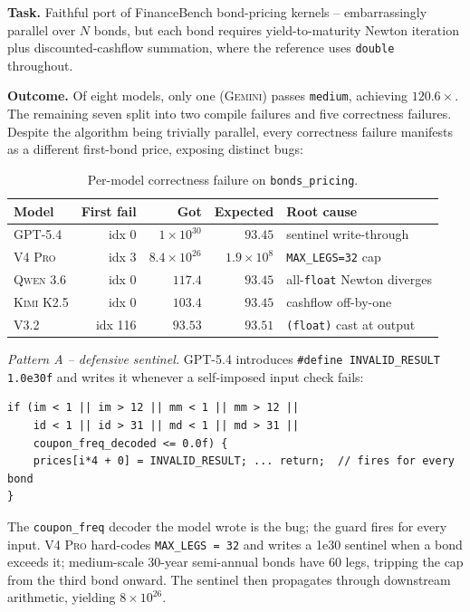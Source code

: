 \documentclass{article}
\begin{document}
\textbf{Task.} Faithful port of FinanceBench bond-pricing kernels --
embarrassingly parallel over $N$ bonds, but each bond requires
yield-to-maturity Newton iteration plus discounted-cashflow
summation, where the reference uses \texttt{double} throughout.

\textbf{Outcome.} Of eight models, only one (\textsc{Gemini}) passes
\texttt{medium}, achieving $120.6\times$. The remaining seven split
into two compile failures and five correctness failures. Despite the
algorithm being trivially parallel, every correctness failure
manifests as a different first-bond price, exposing distinct bugs:

\begin{table}[h]
\centering
\small
\begin{tabular}{lrrrl}
\toprule
Model & First fail & Got & Expected & Root cause \\
\midrule
\textsc{GPT-5.4}  & idx 0   & $1{\times}10^{30}$ & $93.45$ & sentinel write-through \\
\textsc{V4 Pro}   & idx 3   & $8.4{\times}10^{26}$ & $1.9{\times}10^{8}$ & \texttt{MAX\_LEGS=32} cap \\
\textsc{Qwen 3.6} & idx 0   & $117.4$ & $93.45$ & all-\texttt{float} Newton diverges \\
\textsc{Kimi K2.5}& idx 0   & $103.4$ & $93.45$ & cashflow off-by-one \\
\textsc{V3.2}     & idx 116 & $93.53$ & $93.51$ & \texttt{(float)} cast at output \\
\bottomrule
\end{tabular}
\caption{Per-model correctness failure on \texttt{bonds\_pricing}.}
\end{table}

\textit{Pattern A -- defensive sentinel.} \textsc{GPT-5.4} introduces
\texttt{\#define INVALID\_RESULT 1.0e30f} and writes it whenever a
self-imposed input check fails:
\begin{lstlisting}[style=cuda,basicstyle=\ttfamily\footnotesize]
if (im < 1 || im > 12 || mm < 1 || mm > 12 ||
    id < 1 || id > 31 || md < 1 || md > 31 ||
    coupon_freq_decoded <= 0.0f) {
    prices[i*4 + 0] = INVALID_RESULT; ... return;  // fires for every bond
}
\end{lstlisting}
The \texttt{coupon\_freq} decoder the model wrote is the bug; the
guard fires for every input. \textsc{V4 Pro} hard-codes
\texttt{MAX\_LEGS = 32} and writes a 1e30 sentinel when a bond
exceeds it; medium-scale 30-year semi-annual bonds have 60 legs,
tripping the cap from the third bond onward. The sentinel then
propagates through downstream arithmetic, yielding $8{\times}10^{26}$.
\end{document}
